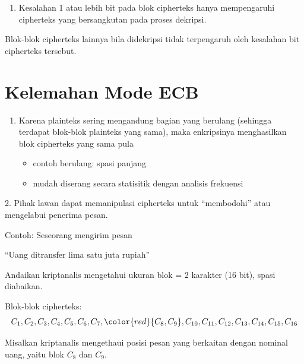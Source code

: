\documentclass{article}
\begin{document}
\newpage


\begin{enumerate}
  \item[2.] Kesalahan 1 atau lebih bit pada blok cipherteks hanya mempengaruhi cipherteks yang bersangkutan pada proses dekripsi.
\end{enumerate}

Blok-blok cipherteks lainnya bila didekripsi tidak terpengaruh oleh kesalahan bit cipherteks tersebut.

\newpage


\section*{Kelemahan Mode ECB}

\begin{enumerate}
    \item Karena plainteks sering mengandung bagian yang berulang (sehingga terdapat blok-blok plainteks yang sama), maka enkripsinya menghasilkan blok cipherteks yang sama pula
    \begin{itemize}
        \item contoh berulang: spasi panjang
        \item mudah diserang secara statisitik dengan analisis frekuensi
    \end{itemize}
\end{enumerate}

\newpage


2. Pihak lawan dapat memanipulasi cipherteks untuk ``membodohi'' atau mengelabui penerima pesan.

Contoh: Seseorang mengirim pesan

``Uang ditransfer lima satu juta rupiah''

\newpage


Andaikan kriptanalis mengetahui ukuran blok = 2 karakter (16 bit), spasi diabaikan.

Blok-blok cipherteks:
\[ C_{1}, C_{2}, C_{3}, C_{4}, C_{5}, C_{6}, C_{7}, \color{red}{C_{8}, C_{9}}, C_{10}, C_{11}, C_{12}, C_{13}, C_{14}, C_{15}, C_{16} \]

Misalkan kriptanalis mengethaui posisi pesan yang berkaitan dengan nominal uang, yaitu blok $C_{8}$ dan $C_{9}$.
\end{document}
